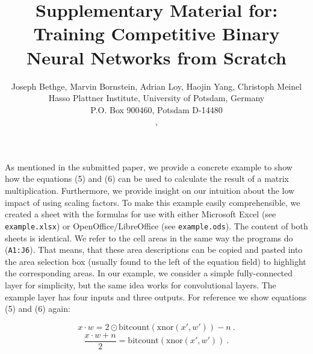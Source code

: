 \documentclass[10pt,twocolumn,letterpaper]{article}
\begin{document}
\title{Supplementary Material for:\\ Training Competitive Binary Neural Networks from Scratch}

\author{
Joseph Bethge\footnotemark[1] , Marvin Bornstein\footnotemark[2] , Adrian Loy\footnotemark[2] , Haojin Yang\footnotemark[1] , Christoph Meinel\footnotemark[1]  \\
Hasso Plattner Institute, University of Potsdam, Germany\\
P.O. Box 900460, Potsdam D-14480\\
, 
}

\maketitle


As mentioned in the submitted paper, we provide a concrete example to show how the equations (5) and (6) can be used to calculate the result of a matrix multiplication.
Furthermore, we provide insight on our intuition about the low impact of using scaling factors.
To make this example easily comprehensible, we created a sheet with the formulas for use with either Microsoft Excel (see \texttt{example.xlsx}) or OpenOffice/LibreOffice (see \texttt{example.ods}).
The content of both sheets is identical.
We refer to the cell areas in the same way the programs do (\eg \texttt{A1:J6}).
That means, that these area descriptions can be copied and pasted into the area selection box (usually found to the left of the equation field) to highlight the corresponding areas.
In our example, we consider a simple fully-connected layer for simplicity, but the same idea works for convolutional layers.
The example layer has four inputs and three outputs.
For reference we show equations (5) and (6) again:

\begin{equation} \tag{5}
\label{eqn:xnor-popcount}
    x \cdot w = 2 \odot \mathrm{bitcount}(\mathrm{xnor}(x',w')) - n~.
\end{equation}
\begin{equation} \tag{6}
\label{eqn:xnor-popcount-swapped}
    \frac{x \cdot w + n}{2} = \mathrm{bitcount}(\mathrm{xnor}(x',w'))~.
\end{equation}
\end{document}
